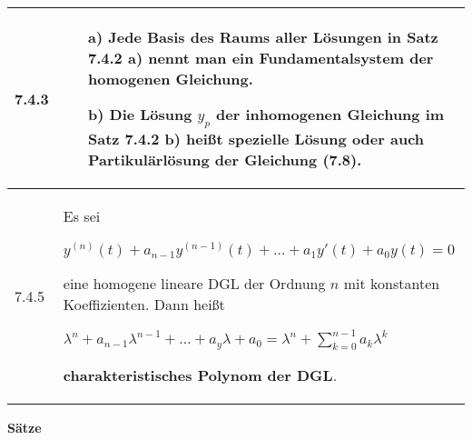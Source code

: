    \begin{longtable}{p{1cm} p{16cm}}
        \toprule

        7.4.3 & \begin{itemize}[topsep=-0.5cm]
                    \item[a)] Jede Basis des Raums aller Lösungen in Satz 7.4.2 a) nennt man ein Fundamentalsystem der homogenen Gleichung.
                    \item[b)] Die Lösung $y_p$ der inhomogenen Gleichung im Satz 7.4.2 b) heißt spezielle Lösung oder auch
                                \textbf{Partikulärlösung der Gleichung (7.8)}.
                \end{itemize} \vspace{-0cm} \\
        \midrule
        7.4.5 & Es sei \hfill \break
                \centerline{$ y^{(n)}(t) + a_{n-1}y^{(n-1)}(t) + \dots + a_1y'(t)+a_0y(t)=0 $}
                eine homogene lineare DGL der Ordnung $n$ mit konstanten Koeffizienten. Dann heißt \hfill \break
                \centerline{$ \lambda^n + a_{n-1}\lambda^{n-1}+ \dots + a_y \lambda+a_0 = \lambda^n + \sum^{n-1}_{k=0} a_k \lambda^k $} 
                \textbf{charakteristisches Polynom der DGL}. \\

        \bottomrule

    \end{longtable}
    

    \noindent 
    \textbf{Sätze}
    
